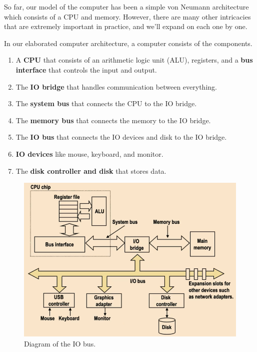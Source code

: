 \documentclass{article}
\begin{document}
    So far, our model of the computer has been a simple von Neumann architecture which consists of a CPU and memory. However, there are many other intricacies that are extremely important in practice, and we'll expand on each one by one. 
    
    \begin{definition}
      In our elaborated computer architecture, a computer consists of the components. 
      \begin{enumerate}
        \item A \textbf{CPU} that consists of an arithmetic logic unit (ALU), registers, and a \textbf{bus interface} that controls the input and output. 
        \item The \textbf{IO bridge} that handles communication between everything. 
        \item The \textbf{system bus} that connects the CPU to the IO bridge. 
        \item The \textbf{memory bus} that connects the memory to the IO bridge. 
        \item The \textbf{IO bus} that connects the IO devices and disk to the IO bridge. 
        \item \textbf{IO devices} like mouse, keyboard, and monitor. 
        \item The \textbf{disk controller and disk} that stores data. 
      \end{enumerate} 
      \begin{figure}[H]
        \centering 
        \includegraphics[scale=0.4]{img/io.png}
        \caption{Diagram of the IO bus.} 
        \label{fig:io}
      \end{figure}
    \end{definition}
\end{document}
